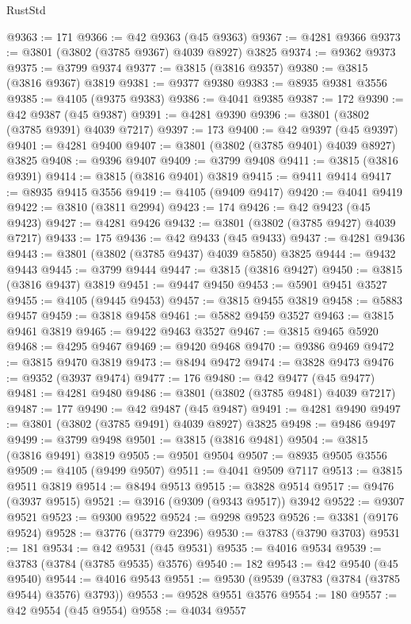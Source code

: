 \begin{lexlean}{RustStd}
\begin{coremodule}
@9363 := 171
@9366 := @42 @9363 (@45 @9363)
@9367 := @4281 @9366
@9373 := @3801 (@3802 (@3785 @9367) @4039 @8927) @3825
@9374 := @9362 @9373
@9375 := @3799 @9374
@9377 := @3815 (@3816 @9357)
@9380 := @3815 (@3816 @9367) @3819
@9381 := @9377 @9380
@9383 := @8935 @9381 @3556
@9385 := @4105 (@9375 @9383)
@9386 := @4041 @9385
@9387 := 172
@9390 := @42 @9387 (@45 @9387)
@9391 := @4281 @9390
@9396 := @3801 (@3802 (@3785 @9391) @4039 @7217)
@9397 := 173
@9400 := @42 @9397 (@45 @9397)
@9401 := @4281 @9400
@9407 := @3801 (@3802 (@3785 @9401) @4039 @8927) @3825
@9408 := @9396 @9407
@9409 := @3799 @9408
@9411 := @3815 (@3816 @9391)
@9414 := @3815 (@3816 @9401) @3819
@9415 := @9411 @9414
@9417 := @8935 @9415 @3556
@9419 := @4105 (@9409 @9417)
@9420 := @4041 @9419
@9422 := @3810 (@3811 @2994)
@9423 := 174
@9426 := @42 @9423 (@45 @9423)
@9427 := @4281 @9426
@9432 := @3801 (@3802 (@3785 @9427) @4039 @7217)
@9433 := 175
@9436 := @42 @9433 (@45 @9433)
@9437 := @4281 @9436
@9443 := @3801 (@3802 (@3785 @9437) @4039 @5850) @3825
@9444 := @9432 @9443
@9445 := @3799 @9444
@9447 := @3815 (@3816 @9427)
@9450 := @3815 (@3816 @9437) @3819
@9451 := @9447 @9450
@9453 := @5901 @9451 @3527
@9455 := @4105 (@9445 @9453)
@9457 := @3815 @9455 @3819
@9458 := @5883 @9457
@9459 := @3818 @9458
@9461 := @5882 @9459 @3527
@9463 := @3815 @9461 @3819
@9465 := @9422 @9463 @3527
@9467 := @3815 @9465 @5920
@9468 := @4295 @9467
@9469 := @9420 @9468
@9470 := @9386 @9469
@9472 := @3815 @9470 @3819
@9473 := @8494 @9472
@9474 := @3828 @9473
@9476 := @9352 (@3937 @9474)
@9477 := 176
@9480 := @42 @9477 (@45 @9477)
@9481 := @4281 @9480
@9486 := @3801 (@3802 (@3785 @9481) @4039 @7217)
@9487 := 177
@9490 := @42 @9487 (@45 @9487)
@9491 := @4281 @9490
@9497 := @3801 (@3802 (@3785 @9491) @4039 @8927) @3825
@9498 := @9486 @9497
@9499 := @3799 @9498
@9501 := @3815 (@3816 @9481)
@9504 := @3815 (@3816 @9491) @3819
@9505 := @9501 @9504
@9507 := @8935 @9505 @3556
@9509 := @4105 (@9499 @9507)
@9511 := @4041 @9509 @7117
@9513 := @3815 @9511 @3819
@9514 := @8494 @9513
@9515 := @3828 @9514
@9517 := @9476 (@3937 @9515)
@9521 := @3916 (@9309 (@9343 @9517)) @3942
@9522 := @9307 @9521
@9523 := @9300 @9522
@9524 := @9298 @9523
@9526 := @3381 (@9176 @9524)
@9528 := @3776 (@3779 @2396)
@9530 := @3783 (@3790 @3703)
@9531 := 181
@9534 := @42 @9531 (@45 @9531)
@9535 := @4016 @9534
@9539 := @3783 (@3784 (@3785 @9535) @3576)
@9540 := 182
@9543 := @42 @9540 (@45 @9540)
@9544 := @4016 @9543
@9551 := @9530 (@9539 (@3783 (@3784 (@3785 @9544) @3576) @3793))
@9553 := @9528 @9551 @3576
@9554 := 180
@9557 := @42 @9554 (@45 @9554)
@9558 := @4034 @9557

\end{coremodule}
\end{lexlean}
